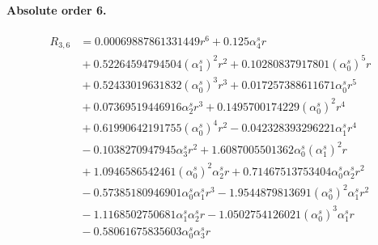 \documentclass[10pt]{article}
\begin{document}
\paragraph{Absolute order 6.}
\begin{align*}
R_{3,6} &= 0.00069887861331449 r^{6} + 0.125 \alpha_{4}^s r \\
&{}  + 0.52264594794504 \left(\alpha_{1}^s\right)^{2} r^{2} + 0.10280837917801 \left(\alpha_{0}^s\right)^{5} r \\
&{}  + 0.52433019631832 \left(\alpha_{0}^s\right)^{3} r^{3} + 0.017257388611671 \alpha_{0}^s r^{5} \\
&{}  + 0.07369519446916 \alpha_{2}^s r^{3} + 0.1495700174229 \left(\alpha_{0}^s\right)^{2} r^{4} \\
&{}  + 0.61990642191755 \left(\alpha_{0}^s\right)^{4} r^{2} - 0.042328393296221 \alpha_{1}^s r^{4} \\
&{}  - 0.1038270947945 \alpha_{3}^s r^{2} + 1.6087005501362 \alpha_{0}^s \left(\alpha_{1}^s\right)^{2} r \\
&{}  + 1.0946586542461 \left(\alpha_{0}^s\right)^{2} \alpha_{2}^s r + 0.71467513753404 \alpha_{0}^s \alpha_{2}^s r^{2} \\
&{}  - 0.57385180946901 \alpha_{0}^s \alpha_{1}^s r^{3} - 1.9544879813691 \left(\alpha_{0}^s\right)^{2} \alpha_{1}^s r^{2} \\
&{}  - 1.1168502750681 \alpha_{1}^s \alpha_{2}^s r - 1.0502754126021 \left(\alpha_{0}^s\right)^{3} \alpha_{1}^s r \\
&{}  - 0.58061675835603 \alpha_{0}^s \alpha_{3}^s r
\end{align*}
\end{document}
